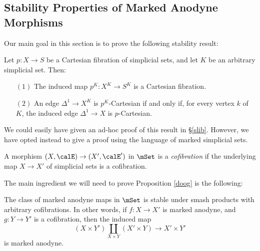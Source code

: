 \subsection{Stability Properties of Marked Anodyne Morphisms}\label{bicat11}

Our main goal in this section is to prove the following stability result:

\begin{proposition}\label{doog}
Let $p: X \rightarrow S$ be a Cartesian fibration of
simplicial sets, and let $K$ be an arbitrary simplicial set. Then:
\begin{itemize}
\item[$(1)$] The induced map $p^K: X^{K} \rightarrow S^{K}$ is a
Cartesian fibration.

\item[$(2)$] An edge $\Delta^1 \rightarrow X^K$ is $p^K$-Cartesian if
and only if, for every vertex $k$ of $K$, the induced edge $\Delta^1
\rightarrow X$ is $p$-Cartesian.
\end{itemize}
\end{proposition}

We could easily have given an ad-hoc proof of this result in \S \ref{slib}. However, we have opted instead to give a proof using the language of marked simplicial sets. 

\begin{definition}
A morphism $(X, \calE) \rightarrow (X', \calE')$ in $\mSet$ is a {\it cofibration} if the underlying map $X \rightarrow X'$ of simplicial sets is a cofibration.
\end{definition}

The main ingredient we will need to prove Proposition \ref{doog} is the following:

\begin{proposition}\label{markanodprod}
The class of marked anodyne maps in $\mSet$ is stable under smash products with arbitrary cofibrations. In other words, if $f: X \rightarrow X'$ is marked anodyne, and 
$g: Y \rightarrow Y'$ is a cofibration, then the induced map
$$ (X \times Y') \coprod_{ X \times Y} (X' \times Y) \rightarrow X' \times Y'$$ is marked anodyne.
\end{proposition}

